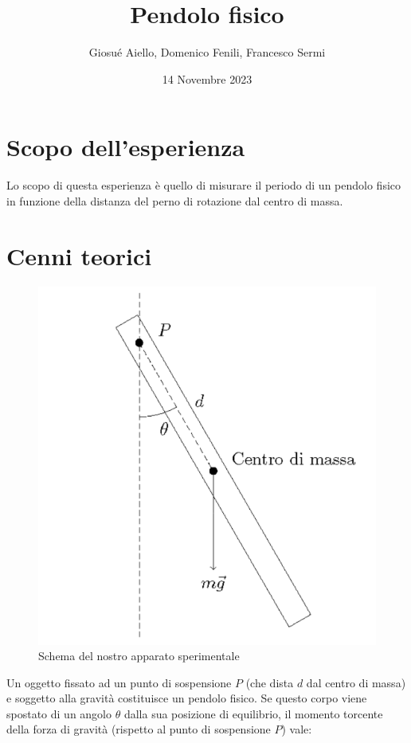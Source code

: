 \documentclass{article}
\title{\Huge{Pendolo fisico}}
\author{\huge{Giosué Aiello, Domenico Fenili, Francesco Sermi}}
\date{14 Novembre 2023}
\begin{document}
\maketitle
\pagebreak
\tableofcontents
\pagebreak

\section{Scopo dell'esperienza}
Lo scopo di questa esperienza è quello di misurare il periodo di un pendolo fisico in funzione della distanza del perno di rotazione dal centro di massa.

\section{Cenni teorici}

\begin{figure}[h!]
	\centering
	\includegraphics[scale=0.35]{pendolo_fisico.png}
	\caption{Schema del nostro apparato sperimentale}
	\label{fig:schema_pendolo}
\end{figure}
\par\smallskip\noindent Un oggetto fissato ad un punto di sospensione $P$ (che dista $d$ dal centro di massa) e soggetto alla gravità costituisce un pendolo fisico. Se questo corpo viene spostato di un angolo $\theta$ dalla sua posizione di equilibrio, il momento torcente della forza di gravità (rispetto al punto di sospensione $P$) vale:
\end{document}
